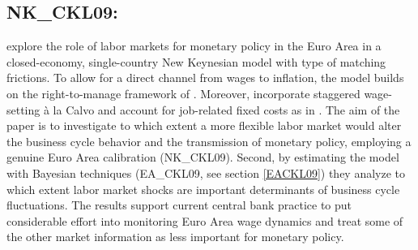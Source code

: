 \documentclass[11pt,a4paper]{article}
\begin{document}
	
	\subsection{NK\_CKL09: \texorpdfstring{\cite{ChristoffelKuesterLinzert2009}}{Christoffel et al. (2009)}}
	\label{NKCKL09}
	
	\cite{ChristoffelKuesterLinzert2009} explore the role of labor markets for monetary policy in the Euro Area in a closed-economy, single-country New Keynesian model with \cite{MortensenPissarides1994} type of matching frictions. To allow for a direct channel from wages to inflation, the model builds on the right-to-manage framework of \cite{Trigari2006}. Moreover, \cite{ChristoffelKuesterLinzert2009} incorporate staggered wage-setting \`{a} la Calvo and account for job-related fixed costs as in \cite{ChristoffelKuester2008}. The aim of the paper is to investigate to which extent a more flexible labor market would alter the business cycle behavior and the transmission of monetary policy, employing a genuine Euro Area calibration (NK\_CKL09). Second, by estimating the model with Bayesian techniques (EA\_CKL09, see section \ref{EACKL09}) they analyze to which extent labor market shocks are important determinants of business cycle fluctuations. The results support current central bank practice to put considerable effort into monitoring Euro Area wage dynamics and treat some of the other market information as less important for monetary policy.
	
\end{document}
